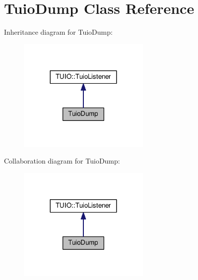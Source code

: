 \hypertarget{class_tuio_dump}{}\section{Tuio\+Dump Class Reference}
\label{class_tuio_dump}


Inheritance diagram for Tuio\+Dump\+:\nopagebreak
\begin{figure}[H]
\begin{center}
\leavevmode
\includegraphics[width=180pt]{class_tuio_dump__inherit__graph}
\end{center}
\end{figure}


Collaboration diagram for Tuio\+Dump\+:\nopagebreak
\begin{figure}[H]
\begin{center}
\leavevmode
\includegraphics[width=180pt]{class_tuio_dump__coll__graph}
\end{center}
\end{figure}

